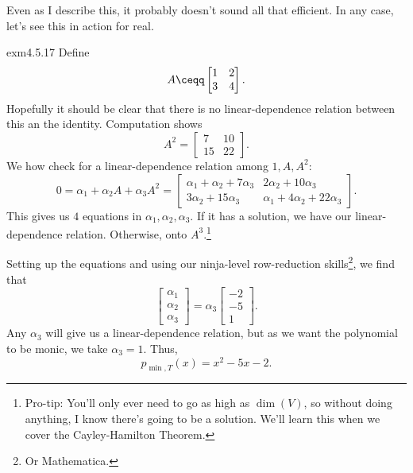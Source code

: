 Even as I describe this, it probably doesn't sound all that efficient.  In any case, let's see this in action for real.
\begin{exm}{}{exm4.5.17}
	Define
	\begin{equation}
		A\ceqq \begin{bmatrix}1 & 2 \\ 3 & 4\end{bmatrix}.
	\end{equation}
	Hopefully it should be clear that there is no linear-dependence relation between this an the identity.  Computation shows
	\begin{equation}
		A^2=\begin{bmatrix}7 & 10 \\ 15 & 22\end{bmatrix}.
	\end{equation}
	We how check for a linear-dependence relation among $1,A,A^2$:
	\begin{equation}
		0=\alpha _1+\alpha _2A+\alpha _3A^2=\begin{bmatrix}\alpha _1+\alpha _2+7\alpha _3 & 2\alpha _2+10\alpha _3 \\ 3\alpha _2+15\alpha _3 & \alpha _1+4\alpha _2+22\alpha _3\end{bmatrix}.
	\end{equation}
	This gives us $4$ equations in $\alpha _1,\alpha _2,\alpha _3$.  If it has a solution, we have our linear-dependence relation.  Otherwise, onto $A^3$.\footnote{Pro-tip:  You'll only ever need to go as high as $\dim (V)$, so without doing anything, I know there's going to be a solution.  We'll learn this when we cover the Cayley-Hamilton Theorem.}
	
	Setting up the equations and using our ninja-level row-reduction skills\footnote{Or Mathematica.}, we find that
	\begin{equation}
		\begin{bmatrix}\alpha _1 \\ \alpha _2 \\ \alpha _3\end{bmatrix}=\alpha _3\begin{bmatrix}-2 \\ -5 \\ 1\end{bmatrix}.
	\end{equation}
	Any $\alpha _3$ will give us a linear-dependence relation, but as we want the polynomial to be monic, we take $\alpha _3=1$.  Thus,
	\begin{equation}
		p_{\min ,T}(x)=x^2-5x-2.
	\end{equation}
	

\end{exm}
